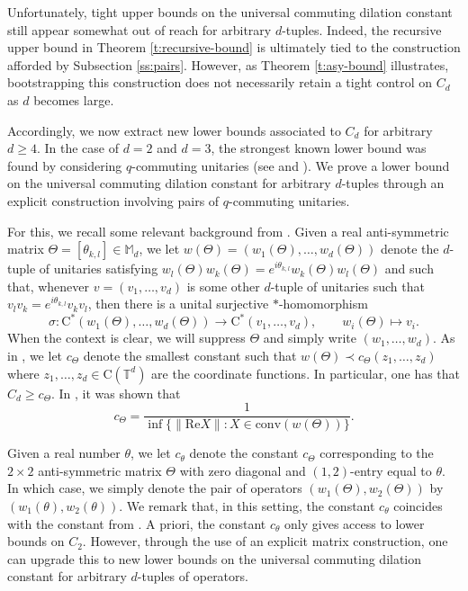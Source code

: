 \documentclass[10pt]{amsart}
\newcommand{\bM}{{\mathbb{M}}}
\newcommand{\bT}{{\mathbb{T}}}
\newcommand{\rC}{\mathrm{C}}
\begin{document}
Unfortunately, tight upper bounds on the universal commuting dilation constant still appear somewhat out of reach for arbitrary $d$-tuples. Indeed, the recursive upper bound in Theorem \ref{t:recursive-bound} is ultimately tied to the construction afforded by Subsection \ref{ss:pairs}. However, as Theorem \ref{t:asy-bound} illustrates, bootstrapping this construction does not necessarily retain a tight control on $C_d$ as $d$ becomes large.

Accordingly, we now extract new lower bounds associated to $C_d$ for arbitrary $d\geq 4$. In the case of $d=2$ and $d=3$, the strongest known lower bound was found by considering $q$-commuting unitaries (see \cite[Section 7]{gerhold2022dilations} and \cite[Corollary 4.7]{gerhold2021dilations}). We prove a lower bound on the universal commuting dilation constant for arbitrary $d$-tuples through an explicit construction involving pairs of $q$-commuting unitaries.

For this, we recall some relevant background from \cites{gerhold2021dilations,gerhold2022dilations}. Given a real anti-symmetric matrix $\Theta = [\theta_{k,l}]\in\bM_d$, we let $w(\Theta) = (w_1(\Theta),\ldots, w_d(\Theta))$ denote the $d$-tuple of unitaries satisfying $w_l(\Theta)w_k(\Theta) = e^{i\theta_{k,l}}w_k(\Theta) w_l(\Theta)$ and such that, whenever $v = (v_1,\ldots, v_d)$ is some other $d$-tuple of unitaries such that $v_lv_k = e^{i\theta_{k,l}}v_k v_l$, then there is a unital surjective $*$-homomorphism
\[
    \sigma: \rC^*(w_1(\Theta),\ldots, w_d(\Theta))\longrightarrow\rC^*(v_1,\ldots, v_d), \qquad w_i(\Theta)\longmapsto v_i.
\]
When the context is clear, we will suppress $\Theta$ and simply write $(w_1, \ldots, w_d)$. As in \cite{gerhold2021dilations}, we let $c_\Theta$ denote the smallest constant such that $w(\Theta)\prec c_\Theta (z_1, \ldots, z_d)$ where $z_1,\ldots, z_d\in\rC(\bT^d)$ are the coordinate functions. In particular, one has that $C_d\geq c_\Theta$. In \cite[Theorem 4.4]{gerhold2021dilations}, it was shown that
\[
    c_\Theta = \frac{1}{\inf\{\|\text{Re} X\| : X\in \text{conv}(w(\Theta))\}}.
\]

Given a real number $\theta$, we let $c_\theta$ denote the constant $c_\Theta$ corresponding to the $2\times 2$ anti-symmetric matrix $\Theta$ with zero diagonal and $(1,2)$-entry equal to $\theta$. In which case, we simply denote the pair of operators $(w_1(\Theta), w_2(\Theta))$ by $(w_1(\theta), w_2(\theta))$. We remark that, in this setting, the constant $c_\theta$ coincides with the constant from \cite{gerhold2022dilations}. A priori, the constant $c_\theta$ only gives access to lower bounds on $C_2$. However, through the use of an explicit matrix construction, one can upgrade this to new lower bounds on the universal commuting dilation constant for arbitrary $d$-tuples of operators.
\end{document}
